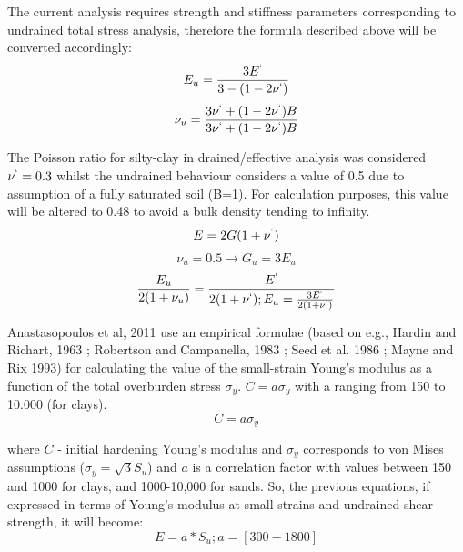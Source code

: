 \documentclass[12pt,a4paper]{report}
\begin{document}
The current analysis requires strength and stiffness parameters corresponding to undrained total stress analysis, therefore the formula described above will be converted accordingly: 
\begin{equation}
	E_u=\frac{3E^`}{3-(1-2\nu^`)}
\end{equation}
\begin{equation}
	\nu_u=\frac{3\nu^`+(1-2\nu^`)B}{3\nu^`+(1-2\nu^`)B}
\end{equation}
	
The Poisson ratio for silty-clay in drained/effective analysis was considered $\nu^`=0.3$ whilst the undrained behaviour considers a value of 0.5 due to assumption of a fully saturated soil (B=1). For calculation purposes, this value will be altered to 0.48 to avoid a bulk density tending to infinity. 
\begin{equation}
	E=2G(1+\nu^`)
\end{equation}
\begin{equation}
	\nu_u=0.5\longrightarrow G_u=3E_u
\end{equation}
\begin{equation}
	\frac{E_u}{2(1+\nu_u)}=\frac{E^`}{2(1+\nu^`); E_u=\frac{3E^`}{2(1+\nu^`)}}
\end{equation}

Anastasopoulos et al, 2011 \cite{anastasopoulos2011simplified} use an empirical formulae (based on e.g., Hardin and Richart, 1963 \cite{hardin1963elastic}; Robertson and Campanella, 1983 \cite{robertson1983interpretation}; Seed et al. 1986 \cite{seed1986use}; Mayne and Rix 1993) for calculating the value of the small-strain Young's modulus as a function of the total overburden stress $\sigma_y$. $C=a{\sigma }_{y}$ with a ranging from 150 to 10.000 (for clays). 
\begin{equation}
	C=a\sigma_y
\end{equation} 

where $C$ - initial hardening Young's modulus and $\sigma_y$ corresponds to von Mises assumptions ($\sigma_y=\sqrt3 S_u$) and $a$ is a correlation factor with values between 150 and 1000 for clays, and 1000-10,000 for sands. So, the previous equations, if expressed in terms of Young's modulus at small strains and undrained shear strength, it will become:
\begin{equation}
	E=a*S_u;   a=[300-1800]
\end{equation}
\end{document}
